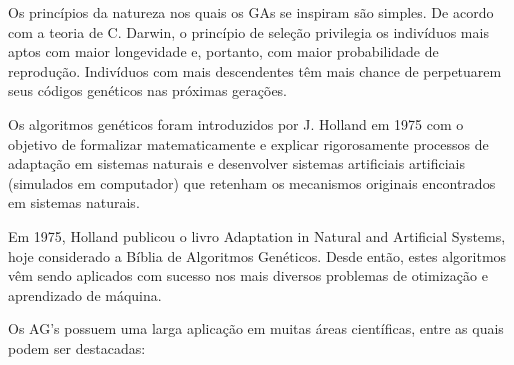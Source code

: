 \documentclass[conference]{IEEEtran}
\begin{document}
Os princípios da natureza nos quais os GAs se inspiram são simples. De  acordo com  a teoria de C. Darwin, o princípio de seleção privilegia os indivíduos mais aptos com maior longevidade e, portanto, com maior probabilidade de reprodução. Indivíduos  com  mais descendentes têm mais chance de perpetuarem seus códigos genéticos nas próximas   gerações.

Os algoritmos genéticos foram introduzidos por J. Holland em 1975 \cite{b1} com o objetivo de formalizar matematicamente e explicar rigorosamente processos de adaptação em sistemas naturais e desenvolver sistemas artificiais artificiais (simulados em computador) que retenham os mecanismos originais encontrados em  sistemas  naturais. 

Em 1975, Holland publicou o livro Adaptation in Natural and Artificial Systems, hoje considerado a Bíblia de Algoritmos Genéticos. Desde então, estes algoritmos vêm sendo aplicados com sucesso nos mais diversos problemas de otimização e aprendizado de máquina. 

Os AG's possuem uma larga aplicação em muitas áreas científicas, entre as quais podem ser destacadas:
    
\end{document}
